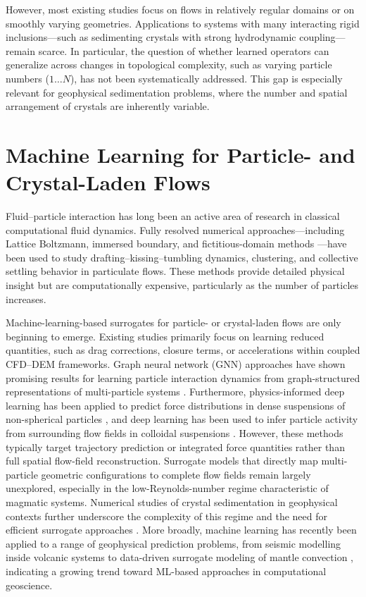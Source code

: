 However, most existing studies focus on flows in relatively regular domains or on smoothly varying geometries. Applications to systems with many interacting rigid inclusions—such as sedimenting crystals with strong
hydrodynamic coupling—remain scarce. In particular, the question of whether learned operators can generalize across changes in topological complexity, such as varying particle numbers ($1 \ldots N$), has not been systematically addressed. This gap is especially relevant for geophysical sedimentation problems, where the number and spatial arrangement of crystals are inherently variable.

\section{Machine Learning for Particle- and Crystal-Laden Flows}

Fluid–particle interaction has long been an active area of research in classical computational fluid dynamics. Fully resolved numerical approaches—including Lattice Boltzmann, immersed boundary, and fictitious-domain methods \parencite{ladd_numerical_nodate,Li_IBM-LBM-DEM_2022,leonardi_coupled_2014}—have been used to study drafting–kissing–tumbling dynamics, clustering, and collective settling behavior in particulate flows. These 
methods provide detailed physical insight but are computationally expensive, particularly as the number of particles increases.

Machine-learning-based surrogates for particle- or crystal-laden flows are only beginning to emerge. Existing studies primarily focus on learning reduced quantities, such as drag corrections, closure terms, or accelerations within coupled CFD–DEM frameworks. Graph neural network (GNN) approaches have shown promising results for learning particle interaction dynamics from graph-structured representations of multi-particle systems \parencite{sanchez-gonzalez_learning_nodate,ma_fast_2022}. Furthermore, physics-informed deep learning has been applied to predict force distributions in dense suspensions of non-spherical particles \parencite{ashwin_physics_2024}, and deep learning has been used to infer particle activity from surrounding flow fields in colloidal suspensions \parencite{mohapatra_inferring_2025}. However, these methods typically target trajectory prediction or integrated force quantities rather than full spatial flow-field reconstruction. Surrogate models that directly map multi-particle geometric configurations to complete flow fields remain largely unexplored, especially in the low-Reynolds-number regime characteristic of magmatic systems. Numerical studies of crystal sedimentation in geophysical contexts further underscore the complexity of this regime and the need for efficient surrogate approaches \parencite{verhoeven_numerical_2009}. More broadly, machine learning has recently been applied to a range of geophysical prediction problems, from seismic modelling inside volcanic systems \parencite{obrien_imaging_2023} to data-driven surrogate modeling of mantle convection \parencite{agarwal_physics-based_2025}, indicating a growing trend toward ML-based approaches in computational geoscience.

